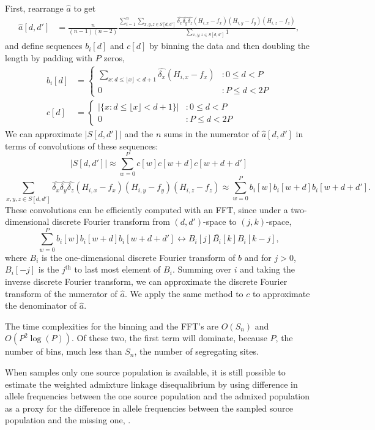\documentclass[10pt]{article}
\begin{document}
First, rearrange $\hat{a}$ to get
\begin{align*}
	\hat{a}[d,d'] &=
	\frac{n}{(n-1)(n-2)}
	\frac{
		\sum_{i=1}^n \sum_{x,y,z\in S[d,d']}
		\hat{\delta_x} \hat{\delta_y} \hat{\delta_z}
		(H_{i,x} - f_x) (H_{i,y} - f_y) (H_{i,z} - f_z)
	}{
		\sum_{x,y,z \in S[d,d']}
		1
	},
\end{align*}
and define sequences $b_i[d]$ and $c[d]$ by binning the data and then doubling
the length by padding with $P$ zeros,
\begin{align*}
	b_i[d] &=
	\left\{
		\begin{array}{ll}
			\sum_{x: d\leq \lfloor{x}\rfloor < d+1} \hat{\delta_x}(H_{i,x}-f_x) & : 0 \leq d < P\\
			0 & : P\leq d <2P
		\end{array}
	\right.\\
	c[d] &=
	\left\{
		\begin{array}{ll}
			|\{x: d\leq \lfloor{x}\rfloor < d+1\}| & : 0\leq d < P\\
			0 & : P\leq d <2P
		\end{array}
	\right.
\end{align*}
We can approximate $|S[d,d']|$ and the $n$ sums in the numerator of
$\hat{a}[d,d']$ in terms of convolutions of these sequences:
$$
	|S[d,d']| \approx \sum_{w=0}^P c[w]c[w+d]c[w+d+d']
$$
$$
	\sum_{x,y,z\in S[d,d']}
	\hat{\delta_x} \hat{\delta_y} \hat{\delta_z}
	(H_{i,x}-f_x)(H_{i,y}-f_y)(H_{i,z}-f_z)
	\approx
	\sum_{w=0}^P b_i[w]b_i[w+d]b_i[w+d+d'].
$$
These convolutions can be efficiently
computed with an FFT, since under a two-dimensional discrete Fourier transform
from $(d, d')$-space to $(j, k)$-space,
$$
\sum_{w=0}^P b_i[w]b_i[w+d]b_i[w+d+d']
\leftrightarrow
B_i[j]\bar{B_i}[k]B_i[k-j],
$$
where $B_i$ is the one-dimensional discrete Fourier transform of $b$ and for
$j>0$, $B_i[-j]$ is the $j^\text{th}$ to last most element of $B_i$.
Summing over $i$ and taking the inverse discrete Fourier transform, we can
approximate the discrete Fourier transform of the numerator of $\hat{a}$. We
apply the same method to $c$ to approximate the denominator of $\hat{a}$.

The time complexities for the binning and the FFT's are $O(S_n)$ and
$O(P^2\log(P))$. Of these two, the first term will dominate, because $P$, the
number of bins, much less than $S_n$, the number of segregating sites.

When samples only one source population is available, it is still possible to
estimate the weighted admixture linkage disequalibrium by using difference in
allele frequencies between the one source population and the admixed population
as a proxy for the difference in allele frequencies between the sampled source
population and the missing one, \cite{pickrell2012inference, loh2013inferring}.
\end{document}
